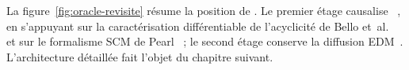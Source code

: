 La figure~\ref{fig:oracle-revisite} résume la position de \Oracle{}. Le premier étage causalise \CorrDiff{}~\cite{mardani_corrdiff_2023}, en s'appuyant sur la caractérisation différentiable de l'acyclicité de Bello et~al.~\cite{bello_dagma_2022} et sur le formalisme SCM de Pearl~\cite{pearl_causality_2009} ; le second étage conserve la diffusion EDM~\cite{karras_edm_2022}. L'architecture détaillée fait l'objet du chapitre suivant.

